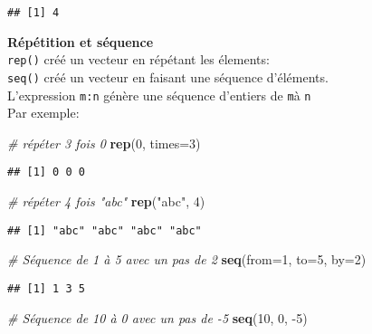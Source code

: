 \documentclass[]{book}
\newenvironment{Shaded}{\begin{snugshade}}{\end{snugshade}}
\newcommand{\CommentTok}[1]{\textcolor[rgb]{0.56,0.35,0.01}{\textit{#1}}}
\newcommand{\DataTypeTok}[1]{\textcolor[rgb]{0.13,0.29,0.53}{#1}}
\newcommand{\DecValTok}[1]{\textcolor[rgb]{0.00,0.00,0.81}{#1}}
\newcommand{\KeywordTok}[1]{\textcolor[rgb]{0.13,0.29,0.53}{\textbf{#1}}}
\newcommand{\NormalTok}[1]{#1}
\newcommand{\StringTok}[1]{\textcolor[rgb]{0.31,0.60,0.02}{#1}}
\begin{document}
\begin{verbatim}
## [1] 4
\end{verbatim}

\textbf{Répétition et séquence}\\
\texttt{rep()} créé un vecteur en répétant les élements:\\
\texttt{seq()} créé un vecteur en faisant une séquence d'éléments.\\
L'expression \texttt{m:n} génère une séquence d'entiers de \texttt{m}à \texttt{n}\\
Par exemple:

\begin{Shaded}
\begin{Highlighting}[]
\CommentTok{# répéter 3 fois 0}
\KeywordTok{rep}\NormalTok{(}\DecValTok{0}\NormalTok{, }\DataTypeTok{times=}\DecValTok{3}\NormalTok{)}
\end{Highlighting}
\end{Shaded}

\begin{verbatim}
## [1] 0 0 0
\end{verbatim}

\begin{Shaded}
\begin{Highlighting}[]
\CommentTok{# répéter 4 fois "abc"}
\KeywordTok{rep}\NormalTok{(}\StringTok{"abc"}\NormalTok{, }\DecValTok{4}\NormalTok{)}
\end{Highlighting}
\end{Shaded}

\begin{verbatim}
## [1] "abc" "abc" "abc" "abc"
\end{verbatim}

\begin{Shaded}
\begin{Highlighting}[]
\CommentTok{# Séquence de 1 à 5 avec un pas de 2}
\KeywordTok{seq}\NormalTok{(}\DataTypeTok{from=}\DecValTok{1}\NormalTok{, }\DataTypeTok{to=}\DecValTok{5}\NormalTok{, }\DataTypeTok{by=}\DecValTok{2}\NormalTok{)}
\end{Highlighting}
\end{Shaded}

\begin{verbatim}
## [1] 1 3 5
\end{verbatim}

\begin{Shaded}
\begin{Highlighting}[]
\CommentTok{# Séquence de 10 à 0 avec un pas de -5}
\KeywordTok{seq}\NormalTok{(}\DecValTok{10}\NormalTok{, }\DecValTok{0}\NormalTok{, }\DecValTok{-5}\NormalTok{)}
\end{Highlighting}
\end{Shaded}
\end{document}
